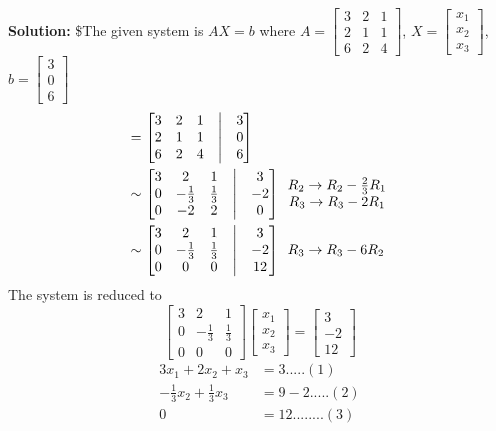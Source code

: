 \documentclass[
  letterpaper,
  DIV=11,
  numbers=noendperiod]{scrreprt}
\begin{document}
\textbf{Solution:} \$The given system is \(AX=b\) where
\(A=\begin{bmatrix}
    3 &2 &1\\
    2 &1 &1\\
    6 &2 &4
\end{bmatrix}\), \(X=\begin{bmatrix}
    x_1\\
    x_2\\
    x_3
\end{bmatrix}\), \(b=\begin{bmatrix}
    3\\
    0\\
    6
\end{bmatrix}\) \begin{align*}
    [A|b]&=\begin{bmatrix}
        3 &2  &1 &\bigm| &3\\
        2 &1 &1 &\bigm| &0\\
        6 &2 &4 &\bigm| &6
    \end{bmatrix}\\
    &\sim \begin{bmatrix}
        3 &2  &1 &\bigm| &3\\
        0 &-\frac{1}{3} &\frac{1}{3} &\bigm| &-2\\
        0 &-2 &2 &\bigm| &0
    \end{bmatrix}\begin{array}{c}
        R_2\rightarrow R_2-\frac{2}{3}R_1\\
        R_3\rightarrow R_3-2R_1
    \end{array}\\
    &\sim \begin{bmatrix}
        3 &2  &1 &\bigm| &3\\
        0 &-\frac{1}{3} &\frac{1}{3} &\bigm| &-2\\
        0 &0 &0 &\bigm| &12
    \end{bmatrix}\begin{array}{c}
        R_3\rightarrow R_3-6R_2
    \end{array}
\end{align*} The system is reduced to \[\begin{bmatrix}
    3 &2 &1\\
    0 &-\frac{1}{3} &\frac{1}{3}\\
    0 &0 &0
\end{bmatrix}\begin{bmatrix}
    x_1\\
    x_2\\
    x_3
\end{bmatrix}=\begin{bmatrix}
    3\\
    -2\\
    12
\end{bmatrix}\] \begin{align*}
    3x_1+2x_2+x_3 &=3.....(1)\\
    -\frac{1}{3}x_2+\frac{1}{3}x_3 &=9-2.....(2)\\
    0 &=12........(3)
\end{align*}
\end{document}
